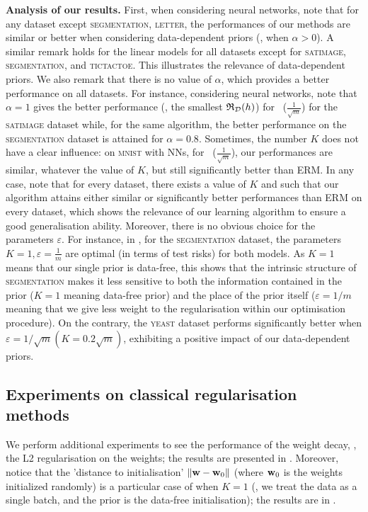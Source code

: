 \begin{noaddcontents}
    
    \textbf{Analysis of our results.}
    First, when considering neural networks, note that for any dataset except \textsc{segmentation}, \textsc{letter}, the performances of our methods are similar or better when considering data-dependent priors (\ie, when $\alpha >0$).
    A similar remark holds for the linear models for all datasets except for \textsc{satimage}, \textsc{segmentation}, and \textsc{tictactoe}. This illustrates the relevance of data-dependent priors.
    We also remark that there is no value of $\alpha$, which provides a better performance on all datasets.
    For instance, considering neural networks, note that $\alpha=1$ gives the better performance (\ie, the smallest $\mathfrak{R}_{\mathcal{D}}(h)$) for ~($\frac{1}{\sqrt{m}}$) for the \textsc{satimage} dataset while, for the same algorithm, the better performance on the \textsc{segmentation} dataset is attained for $\alpha=0.8$. 
    Sometimes, the number $K$ does not have a clear influence: on \textsc{mnist} with NNs, for ~($\frac{1}{\sqrt{m}}$), our performances are similar, whatever the value of $K$, but still significantly better than ERM.
    In any case, note that for every dataset, there exists a value of $K$ and such that our algorithm attains either similar or significantly better performances than ERM on every dataset, which shows the relevance of our learning algorithm to ensure a good generalisation ability.
    Moreover, there is no obvious choice for the parameters $\varepsilon$.
    For instance, in , for the \textsc{segmentation} dataset, the parameters $K=1,\varepsilon=\frac{1}{m}$ are optimal (in terms of test risks) for both models. 
    As $K=1$ means that our single prior is data-free, this shows that the intrinsic structure of \textsc{segmentation} makes it less sensitive to both the information contained in the prior ($K=1$ meaning data-free prior) and the place of the prior itself ($\varepsilon=1/m$ meaning that we give less weight to the regularisation within our optimisation procedure).
    On the contrary, the \textsc{yeast} dataset performs significantly better when $\varepsilon=1/\sqrt{m} (K=0.2\sqrt{m})$, exhibiting a positive impact of our data-dependent priors.
    
    \subsection{Experiments on classical regularisation methods}
    
    We perform additional experiments to see the performance of the weight decay, \ie, the L2 regularisation on the weights; the results are presented in .
    Moreover, notice that the 'distance to initialisation' $\|\mathbf{w}-\mathbf{w}_0\|$ (where $\mathbf{w}_0$ is the weights initialized randomly) is a particular case of  when $K=1$ (\ie, we treat the data as a single batch, and the prior is the data-free initialisation); the results are in .
    

\end{noaddcontents}
